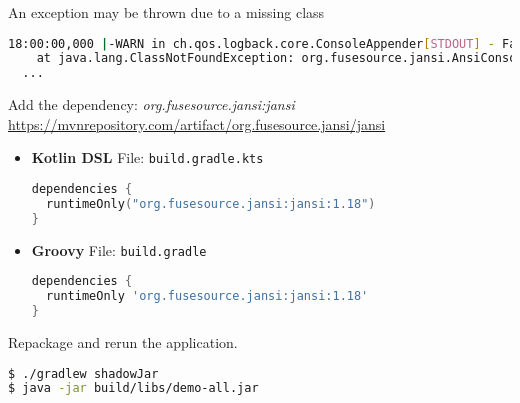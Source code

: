 \begin{enumerate}
An exception may be thrown due to a missing class

\begin{lstlisting}[language=bash]
18:00:00,000 |-WARN in ch.qos.logback.core.ConsoleAppender[STDOUT] - Failed to create AnsiPrintStream. Falling back on the default stream. java.lang.ClassNotFoundException: org.fusesource.jansi.AnsiConsole
	at java.lang.ClassNotFoundException: org.fusesource.jansi.AnsiConsole
  ...
\end{lstlisting}

Add the dependency: \textit{org.fusesource.jansi:jansi}
\newline
{\footnotesize \url{https://mvnrepository.com/artifact/org.fusesource.jansi/jansi}}

\begin{itemize}

\item[] \textbf{Kotlin DSL}
\newline
File: \texttt{build.gradle.kts}

\begin{lstlisting}[language=Kotlin]
dependencies {
  runtimeOnly("org.fusesource.jansi:jansi:1.18")
}
\end{lstlisting}

\item[] \textbf{Groovy}
\newline
File: \texttt{build.gradle}

\begin{lstlisting}[language=Groovy]
dependencies {
  runtimeOnly 'org.fusesource.jansi:jansi:1.18'
}
\end{lstlisting}

\end{itemize}

Repackage and rerun the application.

\begin{lstlisting}[language=bash]
$ ./gradlew shadowJar
$ java -jar build/libs/demo-all.jar
\end{lstlisting}

\end{enumerate}
